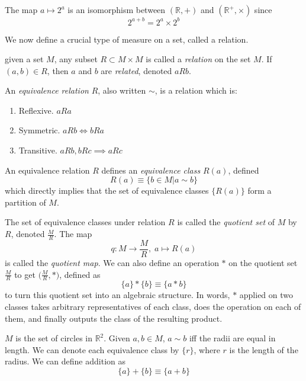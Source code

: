 \documentclass{article}
\begin{document}
\begin{example}
  The map $a \mapsto 2^{a}$ is an isomorphism between $(\mathbb{R}, +)$ and $(\mathbb{R}^{+}, \times)$ since 
  \[2^{a+b} = 2^a \times 2^b \]
\end{example}

We now define a crucial type of measure on a set, called a relation.  

\begin{definition}
  given a set $M$, any subset $R \subset M \times M$ is called a \textit{relation} on the set $M$. If $(a, b) \in R$, then $a$ and $b$ are \textit{related}, denoted $a R b$. 
\end{definition}

\begin{definition}
  An \textit{equivalence relation} $R$, also written $\sim$, is a relation which is:
  \begin{enumerate}
    \item Reflexive. $a R a$ 
    \item Symmetric. $a R b \iff b R a$ 
    \item Transitive. $a R b, b R c \implies a R c$ 
  \end{enumerate}
  An equivalence relation $R$ defines an \textit{equivalence class} $R(a)$, defined 
  \[ R(a) \equiv \{ b \in M | a\sim b \} \]
  which directly implies that the set of equivalence classes $\{R(a)\}$ form a partition of $M$. 
\end{definition}

\begin{definition}
  The set of equivalence classes under relation $R$ is called the \textit{quotient set} of $M$ by $R$, denoted $\frac{M}{R}$.
  The map 
  \[q: M \longrightarrow \frac{M}{R}, \; a \mapsto R(a)\] 
  is called the \textit{quotient map}. We can also define an operation $*$ on the quotient set $\frac{M}{R}$ to get $\big( \frac{M}{R}, * \big)$, defined as
  \[ \{a \} * \{ b \} \equiv \{ a * b \} \]
  to turn this quotient set into an algebraic structure. In words, $*$ applied on two classes takes arbitrary representatives of each class, does the operation on each of them, and finally outputs the class of the resulting product. 
\end{definition}

\begin{example}
  $M$ is the set of circles in $\mathbb{R}^{2}$. Given $a, b \in M$, $a \sim b$ iff the radii are equal in length. We can denote each equivalence class by $\{ r \}$, where $r$ is the length of the radius. We can define addition as 
  \[ \{ a \} + \{ b \} \equiv \{ a + b\} \]
\end{example}
\end{document}
